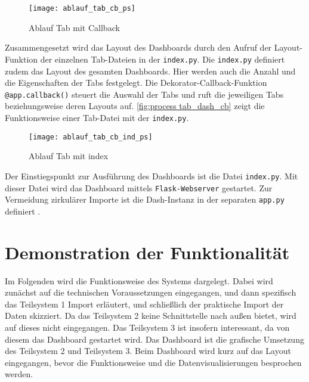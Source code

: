     \begin{figure}[H]
        \centering
            \texttt{[image: ablauf\_tab\_cb\_ps]}
            \caption{Ablauf Tab mit Callback}
            \label{fig:process tab_dash_cb}
    \end{figure}


    Zusammengesetzt wird das Layout des Dashboards durch den Aufruf der Layout-Funktion der einzelnen Tab-Dateien in der \texttt{index.py}.
    Die \texttt{index.py} definiert zudem das Layout des gesamten Dashboards. Hier werden auch die Anzahl und die Eigenschaften der Tabs festgelegt. 
    Die Dekorator-Callback-Funktion \texttt{@app.callback()} steuert die Auswahl der Tabs und ruft die jeweiligen Tabs beziehungsweise deren 
    Layouts auf. \autoref{fig:process tab_dash_cb} zeigt die Funktionsweise einer Tab-Datei mit der \texttt{index.py}.

    \begin{figure}[H]
        \centering
            \texttt{[image: ablauf\_tab\_cb\_ind\_ps]}
            \caption{Ablauf Tab mit index}
            \label{fig:process tab_dash_cb}
    \end{figure}

    Der Einstiegspunkt zur Ausführung des Dashboards ist die Datei \texttt{index.py}. Mit dieser Datei wird das Dashboard mittels \texttt{Flask-Webserver}
    gestartet. Zur Vermeidung zirkulärer Importe ist die Dash-Instanz in der separaten \texttt{app.py} definiert \cite[vgl.][]{plotly_url_2021}.



\section{Demonstration der Funktionalität}

    Im Folgenden wird die Funktionsweise des Systems dargelegt. 
    Dabei wird zunächst auf die technischen Voraussetzungen eingegangen, und dann spezifisch das Teilsystem 1 Import erläutert, und schließlich der
    praktische Import der Daten skizziert. Da das Teilsystem 2 keine Schnittstelle
    nach außen bietet, wird auf dieses nicht eingegangen. Das Teilsystem 3 ist insofern interessant, da von diesem das Dashboard
    gestartet wird. Das Dashboard ist die grafische Umsetzung des Teilsystem 2 und Teilsystem 3. Beim Dashboard wird kurz auf das Layout
    eingegangen, bevor die Funktionsweise und die Datenvisualisierungen besprochen werden.


